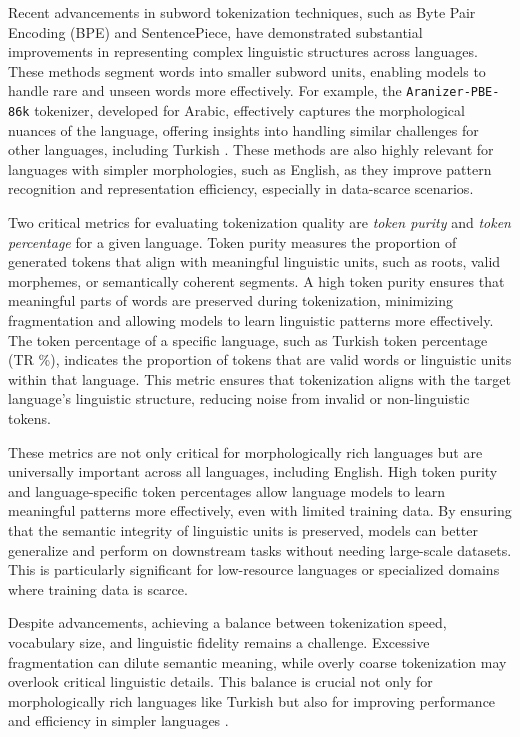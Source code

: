 \documentclass{article}
\begin{document}
  Recent advancements in subword tokenization techniques, such as Byte Pair Encoding (BPE) and SentencePiece, have demonstrated substantial improvements in representing complex linguistic structures across languages. These methods segment words into smaller subword units, enabling models to handle rare and unseen words more effectively. For example, the \texttt{Aranizer-PBE-86k} tokenizer, developed for Arabic, effectively captures the morphological nuances of the language, offering insights into handling similar challenges for other languages, including Turkish \cite{koubaa_githubcomriotu-labaranizer_2024}. These methods are also highly relevant for languages with simpler morphologies, such as English, as they improve pattern recognition and representation efficiency, especially in data-scarce scenarios.
  
  Two critical metrics for evaluating tokenization quality are \textit{token purity} and \textit{token percentage} for a given language. Token purity measures the proportion of generated tokens that align with meaningful linguistic units, such as roots, valid morphemes, or semantically coherent segments. A high token purity ensures that meaningful parts of words are preserved during tokenization, minimizing fragmentation and allowing models to learn linguistic patterns more effectively. The token percentage of a specific language, such as Turkish token percentage (TR \%), indicates the proportion of tokens that are valid words or linguistic units within that language. This metric ensures that tokenization aligns with the target language's linguistic structure, reducing noise from invalid or non-linguistic tokens.
  
  These metrics are not only critical for morphologically rich languages but are universally important across all languages, including English. High token purity and language-specific token percentages allow language models to learn meaningful patterns more effectively, even with limited training data. By ensuring that the semantic integrity of linguistic units is preserved, models can better generalize and perform on downstream tasks without needing large-scale datasets. This is particularly significant for low-resource languages or specialized domains where training data is scarce.
  
  Despite advancements, achieving a balance between tokenization speed, vocabulary size, and linguistic fidelity remains a challenge. Excessive fragmentation can dilute semantic meaning, while overly coarse tokenization may overlook critical linguistic details. This balance is crucial not only for morphologically rich languages like Turkish but also for improving performance and efficiency in simpler languages \cite{neubeck_so_2024}.
  
\end{document}

